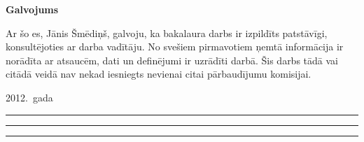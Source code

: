 \begin{center}
	\Large\bfseries Galvojums
\end{center}

Ar šo es, Jānis Šmēdiņš, galvoju, ka bakalaura darbs ir izpildīts patstāvīgi,
konsultējoties ar darba vadītāju. No svešiem pirmavotiem ņemtā informācija
ir norādīta ar atsaucēm, dati un definējumi ir uzrādīti darbā.
Šis darbs tādā vai citādā veidā nav nekad iesniegts nevienai
citai pārbaudījumu komisijai.

\vspace{3cm}
\noindent
\begin{minipage}{\textwidth}
	\raggedright
	2012.~gada \textcolor{gray}{\rule[-2pt]{2em}{1pt} \rule[-2pt]{10em}{1pt}}
	\hfill
	\textcolor{gray}{\rule[-2pt]{10em}{1pt}}\\[-1ex]
	\hfill{}
\end{minipage}
